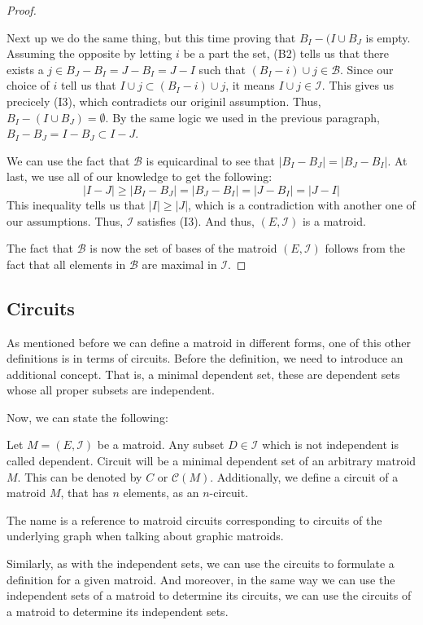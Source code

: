 \begin{proof}
\begin{enumerate}
        Next up we do the same thing, but this time proving that $B_I-(I\cup B_J$ is empty. Assuming the opposite by letting $i$ be a part the set, (B2) tells us that there exists a $j\in B_J-B_I=J-B_I=J-I$ such that $(B_I-i)\cup j\in\mathcal{B}$. Since our choice of $i$ tell us that $I\cup j\subset (B_I-i)\cup j$, it means $I\cup j\in\mathcal{I}$. This gives us precicely (I3), which contradicts our originil assumption. Thus, $B_I-(I\cup B_J)=\emptyset$. By the same logic we used in the previous paragraph, $B_I-B_J=I-B_J\subset I-J$.

        We can use the fact that $\mathcal{B}$ is equicardinal to see that $|B_I-B_J|=|B_J-B_I|$. At last, we use all of our knowledge to get the following:
        $$ |I-J|\geq |B_I-B_J|=|B_J-B_I|=|J-B_I|=|J-I| $$
        This inequality tells us that $|I|\geq |J|$, which is a contradiction with another one of our assumptions. Thus, $\mathcal{I}$ satisfies (I3). And thus, $(E,\mathcal{I})$ is a matroid.
    \end{enumerate}  
    The fact that $\mathcal{B}$ is now the set of bases of the matroid $(E,\mathcal{I})$ follows from the fact that all elements in $\mathcal{B}$ are maximal in $\mathcal{I}$.
\end{proof}





\subsection{Circuits} 
As mentioned before we can define a matroid in different forms, one of this other definitions is in terms of circuits. Before the definition, we need to introduce an additional concept. 
That is, a minimal dependent set, these are dependent sets whose all proper subsets are independent.

Now, we can state the following:
\begin{defn}
Let $M = (E, \mathcal{I})$ be a matroid. Any subset $D \in \mathcal{I}$ which is not independent is called dependent. Circuit will be a minimal dependent set of an arbitrary matroid $M$. This can be denoted by $C$ or $\mathcal{C}(M)$. Additionally, we define a circuit of a matroid $M$, that has $n$ elements, as an $n$-circuit.
\end{defn}

The name is a reference to matroid circuits corresponding to circuits of the underlying graph when talking about graphic matroids.

Similarly, as with the independent sets, we can use the circuits to formulate a definition for a given matroid. And moreover, in the same way we can use the independent sets of a matroid to determine its circuits, we can use the circuits of a matroid to determine its independent sets.


